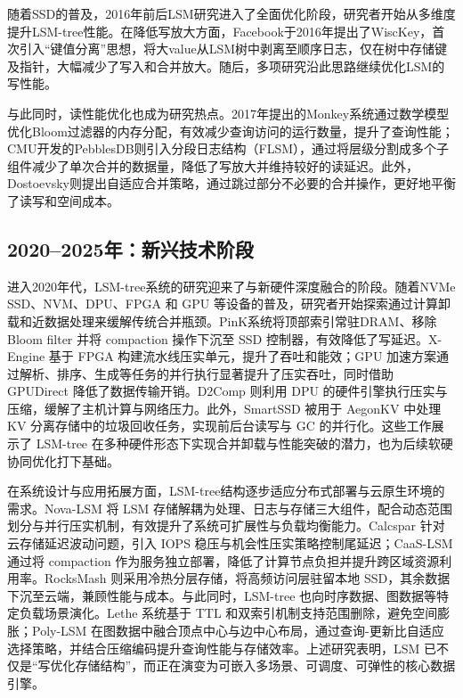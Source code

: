 \documentclass[lang=cn,11pt,a4paper]{elegantpaper}
\begin{document}
随着SSD的普及，2016年前后LSM研究进入了全面优化阶段，研究者开始从多维度提升LSM-tree性能。在降低写放大方面，Facebook于2016年提出了WiscKey，首次引入“键值分离”思想，将大value从LSM树中剥离至顺序日志，仅在树中存储键及指针，大幅减少了写入和合并放大。随后，多项研究沿此思路继续优化LSM的写性能。

与此同时，读性能优化也成为研究热点。2017年提出的Monkey系统通过数学模型优化Bloom过滤器的内存分配，有效减少查询访问的运行数量，提升了查询性能；CMU开发的PebblesDB则引入分段日志结构（FLSM），通过将层级分割成多个子组件减少了单次合并的数据量，降低了写放大并维持较好的读延迟。此外，Dostoevsky则提出自适应合并策略，通过跳过部分不必要的合并操作，更好地平衡了读写和空间成本。


\subsection{2020–2025年：新兴技术阶段}
进入2020年代，LSM-tree系统的研究迎来了与新硬件深度融合的阶段。随着NVMe SSD、NVM、DPU、FPGA 和 GPU 等设备的普及，研究者开始探索通过计算卸载和近数据处理来缓解传统合并瓶颈。PinK系统将顶部索引常驻DRAM、移除 Bloom filter 并将 compaction 操作下沉至 SSD 控制器，有效降低了写延迟。X-Engine 基于 FPGA 构建流水线压实单元，提升了吞吐和能效；GPU 加速方案通过解析、排序、生成等任务的并行执行显著提升了压实吞吐，同时借助 GPUDirect 降低了数据传输开销。D2Comp 则利用 DPU 的硬件引擎执行压实与压缩，缓解了主机计算与网络压力。此外，SmartSSD 被用于 AegonKV 中处理 KV 分离存储中的垃圾回收任务，实现前后台读写与 GC 的并行化。这些工作展示了 LSM-tree 在多种硬件形态下实现合并卸载与性能突破的潜力，也为后续软硬协同优化打下基础。

在系统设计与应用拓展方面，LSM-tree结构逐步适应分布式部署与云原生环境的需求。Nova-LSM 将 LSM 存储解耦为处理、日志与存储三大组件，配合动态范围划分与并行压实机制，有效提升了系统可扩展性与负载均衡能力。Calcspar 针对云存储延迟波动问题，引入 IOPS 稳压与机会性压实策略控制尾延迟；CaaS-LSM 通过将 compaction 作为服务独立部署，降低了计算节点负担并提升跨区域资源利用率。RocksMash 则采用冷热分层存储，将高频访问层驻留本地 SSD，其余数据下沉至云端，兼顾性能与成本。与此同时，LSM-tree 也向时序数据、图数据等特定负载场景演化。Lethe 系统基于 TTL 和双索引机制支持范围删除，避免空间膨胀；Poly-LSM 在图数据中融合顶点中心与边中心布局，通过查询-更新比自适应选择策略，并结合压缩编码提升查询性能与存储效率。上述研究表明，LSM 已不仅是“写优化存储结构”，而正在演变为可嵌入多场景、可调度、可弹性的核心数据引擎。
\end{document}
